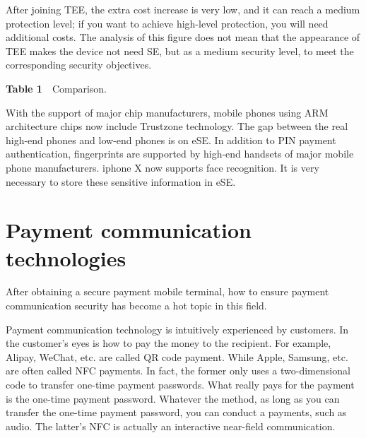 \documentclass[journal]{IEEEtran}
\begin{document}
After joining TEE, the extra cost increase is very low, and it can reach a medium protection level; if you want to achieve high-level protection, you will need additional costs. The analysis of this figure does not mean that the appearance of TEE makes the device not need SE, but as a medium security level, to meet the corresponding security objectives.
\\
\begin{center}
\textbf{Table 1}~~Comparison.\\
\end{center}


With the support of major chip manufacturers, mobile phones using ARM architecture chips now include Trustzone technology. The gap between the real high-end phones and low-end phones is on eSE. In addition to PIN payment authentication, fingerprints are supported by high-end handsets of major mobile phone manufacturers. iphone X now supports face recognition. It is very necessary to store these sensitive information in eSE.

\section{Payment communication technologies}
After obtaining a secure payment mobile terminal, how to ensure payment communication security has become a hot topic in this field.

Payment communication technology is intuitively experienced by customers. In the customer's eyes is how to pay the money to the recipient. For example, Alipay, WeChat, etc. are called QR code payment. While Apple, Samsung, etc. are often called NFC payments. In fact, the former only uses a two-dimensional code to transfer one-time payment passwords. What really pays for the payment is the one-time payment password. Whatever the method, as long as you can transfer the one-time payment password, you can conduct a payments, such as audio. The latter's NFC is actually an interactive near-field communication.
\end{document}
